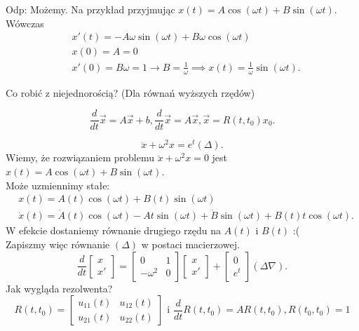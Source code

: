 \documentclass[../main.tex]{subfiles}
\begin{document}
        Odp: Możemy. Na przykład przyjmując $x(t) = A \cos(\omega t) + B \sin(\omega t)$. Wówczas
        \begin{align*}
            &x'(t) = -A\omega \sin(\omega t) + B \omega \cos(\omega t)\\
            &x(0) = A = 0\\
            &x'(0) = B\omega = 1 \to B = \frac{1}{\omega} \implies x(t) = \frac{1}{\omega}\sin(\omega t)
        .\end{align*}
        \begin{pytanie}
            Co robić z niejednorością? (Dla równań wyższych rzędów)
        \end{pytanie}
        \[
            \frac{d}{dt}\vec{x} = A \vec{x} + b, \frac{d}{dt} \vec{x} = A \vec{x}, \vec{x} = R(t,t_0)x_0
        .\]
        \begin{przyklad}
            \[
                \ddot{x} + \omega^2 x = e^t (\Delta)
            .\]
            Wiemy, że rozwiązaniem problemu $\ddot{x} + \omega^2 x = 0$ jest $x(t) = A \cos(\omega t) + B \sin(\omega t)$.\\
            Może uzmiennimy stałe:
            \begin{align*}
                &x(t) = A(t) \cos(\omega t) + B(t) \sin(\omega t)\\
                &\dot{x}(t) = \dot{A}(t) \cos(\omega t) - A t \sin (\omega t) + \dot{B} \sin(\omega t) + B(t) t \cos(\omega t)
            .\end{align*}
            W efekcie dostaniemy równanie drugiego rzędu na $A(t)$ i $B(t)$ :(\\
            Zapiszmy więc równanie $(\Delta)$ w postaci macierzowej.
            \[
                \frac{d}{dt}\begin{bmatrix} x\\x' \end{bmatrix} = \begin{bmatrix} 0&1\\-\omega^2&0 \end{bmatrix} \begin{bmatrix} x\\x' \end{bmatrix} + \begin{bmatrix} 0\\e^t \end{bmatrix} (\Delta\nabla)
            .\]
            Jak wygląda rezolwenta?
            \[
                R(t,t_0) = \begin{bmatrix} u_{11}(t)&u_{12}(t)\\ u_{21}(t) & u_{22}(t) \end{bmatrix} \text{ i } \frac{d}{dt}R(t,t_0) = A R(t,t_0), R(t_0,t_0) = 1
\]
\end{przyklad}
\end{document}
